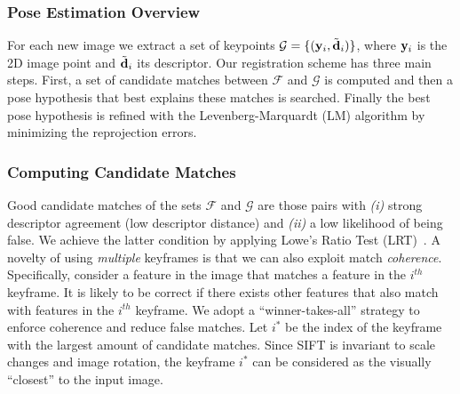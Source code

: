 \subsubsection{Pose Estimation Overview}
\label{sec:registration}
For each new image we extract a set of keypoints $\mathcal{G}=\{(\mathbf{y}_{i},\tilde{\mathbf{d}}_{i})\}$, where $\mathbf{y}_{i}$ is the 2D image point and $\tilde{\mathbf{d}}_{i}$ its descriptor. Our registration scheme has three main steps. First, a set of candidate matches between $\mathcal{F}$ and $\mathcal{G}$ is computed and then a pose hypothesis that best explains these matches is searched. Finally the best pose hypothesis is refined with the Levenberg-Marquardt (LM) algorithm by minimizing the reprojection errors.

\subsubsection{Computing Candidate Matches}
Good candidate matches of the sets $\mathcal{F}$ and $\mathcal{G}$ are those pairs with \textit{(i)} strong descriptor agreement (\ie low descriptor distance) and \textit{(ii)} a low likelihood of being false.
We achieve the latter condition by applying Lowe's Ratio Test (LRT)~\cite{Lowe:2004:DIF:993451.996342}.
A novelty of using \emph{multiple} keyframes is that we can also exploit match \emph{coherence}. Specifically, consider a feature in the image that matches a feature in the $i^{th}$ keyframe. It is likely to be correct if there exists other features that also match with features in the $i^{th}$ keyframe.
We adopt a ``winner-takes-all'' strategy to enforce coherence and reduce false matches.
Let $i^*$ be the index of the keyframe with the largest amount of candidate matches.
Since SIFT is invariant to scale changes and image rotation, the keyframe $i^*$ can be considered as the visually ``closest'' to the input image.
